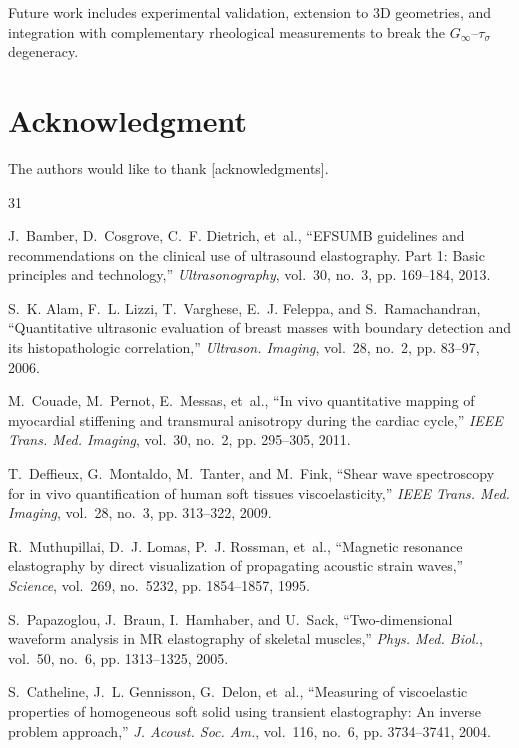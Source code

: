 \documentclass[journal]{IEEEtran}
\begin{document}
Future work includes experimental validation, extension to 3D geometries, and integration with complementary rheological measurements to break the $G_\infty$--$\tau_\sigma$ degeneracy.

\section*{Acknowledgment}

The authors would like to thank [acknowledgments].

\begin{thebibliography}{31}

J.~Bamber, D.~Cosgrove, C.~F. Dietrich, et~al., ``EFSUMB guidelines and recommendations on the clinical use of ultrasound elastography. Part 1: Basic principles and technology,'' \emph{Ultrasonography}, vol.~30, no.~3, pp. 169--184, 2013.

S.~K. Alam, F.~L. Lizzi, T.~Varghese, E.~J. Feleppa, and S.~Ramachandran, ``Quantitative ultrasonic evaluation of breast masses with boundary detection and its histopathologic correlation,'' \emph{Ultrason. Imaging}, vol.~28, no.~2, pp. 83--97, 2006.

M.~Couade, M.~Pernot, E.~Messas, et~al., ``In vivo quantitative mapping of myocardial stiffening and transmural anisotropy during the cardiac cycle,'' \emph{IEEE Trans. Med. Imaging}, vol.~30, no.~2, pp. 295--305, 2011.

T.~Deffieux, G.~Montaldo, M.~Tanter, and M.~Fink, ``Shear wave spectroscopy for in vivo quantification of human soft tissues viscoelasticity,'' \emph{IEEE Trans. Med. Imaging}, vol.~28, no.~3, pp. 313--322, 2009.

R.~Muthupillai, D.~J. Lomas, P.~J. Rossman, et~al., ``Magnetic resonance elastography by direct visualization of propagating acoustic strain waves,'' \emph{Science}, vol.~269, no.~5232, pp. 1854--1857, 1995.

S.~Papazoglou, J.~Braun, I.~Hamhaber, and U.~Sack, ``Two-dimensional waveform analysis in MR elastography of skeletal muscles,'' \emph{Phys. Med. Biol.}, vol.~50, no.~6, pp. 1313--1325, 2005.

S.~Catheline, J.~L. Gennisson, G.~Delon, et~al., ``Measuring of viscoelastic properties of homogeneous soft solid using transient elastography: An inverse problem approach,'' \emph{J. Acoust. Soc. Am.}, vol.~116, no.~6, pp. 3734--3741, 2004.


\end{thebibliography}
\end{document}
